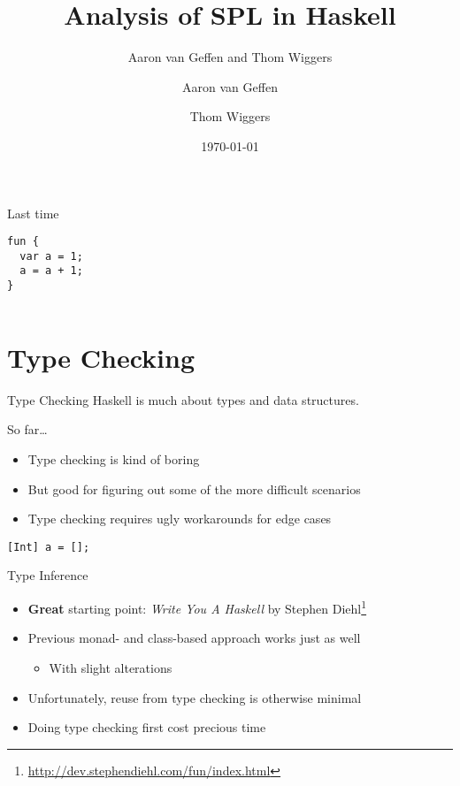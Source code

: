 \documentclass[department=icis, slidenumbers=slide, official=true]{beamerruhuisstijl}
\title{Analysis of SPL in Haskell}
\subtitle{Aaron van Geffen and Thom Wiggers}
\date{\today}
\author{Aaron van Geffen \and Thom Wiggers}
\begin{document}
\begin{frame}
    \titlepage{}
\end{frame}

%
%
%
%


\begin{frame}[fragile]{Last time}
\begin{verbatim}
fun {
  var a = 1;
  a = a + 1;
}
\end{verbatim}
\pause{}

\inputminted{Haskell}{ex1.hs}
\end{frame}

\section{Type Checking}
\begin{frame}[fragile]{Type Checking}
    Haskell is much about types and data structures.
    


\end{frame}

\begin{frame}[fragile]{So far\ldots}
    \begin{itemize}
        \item Type checking is kind of boring
        \item But good for figuring out some of the more difficult scenarios
        \item Type checking requires ugly workarounds for edge cases
    \end{itemize}

\begin{verbatim}
[Int] a = [];
\end{verbatim}
\end{frame}

\begin{frame}{Type Inference}
    \begin{itemize}[<+->]
        \item \textbf{Great} starting point: \emph{Write You A Haskell} by Stephen Diehl\footnote{\url{http://dev.stephendiehl.com/fun/index.html}}
        \item Previous monad- and class-based approach works just as well
            \begin{itemize}
                \item<1-> With slight alterations
            \end{itemize}
        \item Unfortunately, reuse from type checking is otherwise minimal
        \item Doing type checking first cost precious time
    \end{itemize}
\end{frame}
\end{document}
